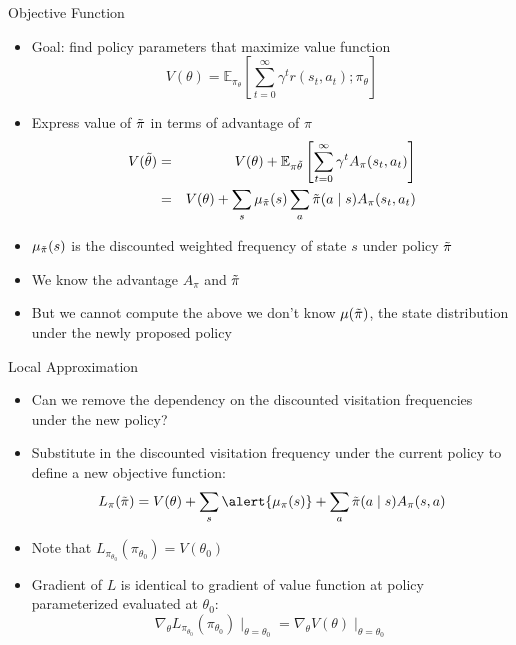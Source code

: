 \documentclass[aspectratio=169]{../latex_main/tntbeamer}  %
\begin{document}
\begin{frame}[c]{Objective Function}
	\vspace{-1em}
    \begin{itemize}
        \item Goal: find policy parameters that maximize value function
        $$ V(\theta) = \mathbb{E}_{\pi_\theta} \left[ \sum_{t=0}^{\infty} \gamma^t r(s_t, a_t); \pi_\theta \right]$$
        \item Express value of $\Tilde{\pi}$ in terms of advantage of $\pi$
        \begin{eqnarray}
        V(\Tilde{\theta}) &=& V(\theta) + \mathbb{E}_{\pi{\Tilde{\theta}}} \left[ \sum_{t=0}^{\infty} \gamma^t A_\pi(s_t, a_t) \right]\\
        &=& V(\theta) + \sum_{s} \mu_{\Tilde{\pi}}(s) \sum_{a} \Tilde{\pi}(a \mid s) A_\pi(s_t, a_t) 
        \end{eqnarray}
        \item $ \mu_{\Tilde{\pi}}(s)$ is the discounted weighted frequency of state $s$ under policy $\Tilde{\pi}$
        \item We know the advantage $A_\pi$ and $\Tilde{\pi}$
        \item But we cannot compute the above we don't know $\mu(\Tilde{\pi})$, the state distribution under the newly proposed policy
    \end{itemize}

\end{frame}
\begin{frame}[c]{Local Approximation}
	
    \begin{itemize}
        \item Can we remove the dependency on the discounted visitation frequencies under the new policy?
        \item Substitute in the discounted visitation frequency under the current policy to define a new objective function:
        $$ L_\pi(\Tilde{\pi}) = V(\theta) + \sum_{s} \alert{\mu_\pi (s)} + \sum_{a} \Tilde{\pi}(a \mid s) A_\pi(s,a)$$
        \item Note that $L_{\pi_{\theta_0}}(\pi_{\theta_0}) = V(\theta_0)$
        \item Gradient of $L$ is identical to gradient of value function at policy parameterized evaluated at $\theta_0$: 
        $$\nabla_{\theta} L_{\pi_{\theta_0}}(\pi_{\theta_0})\mid_{\theta = \theta_0} = \nabla_\theta V(\theta)\mid_{\theta = \theta_0}$$
    \end{itemize}

\end{frame}
\end{document}
